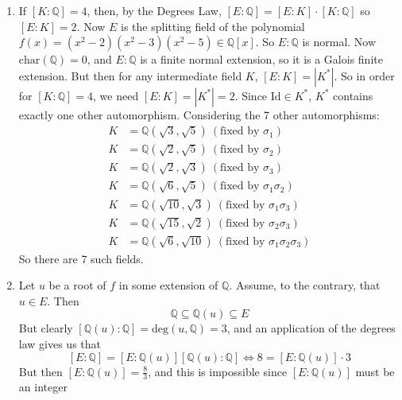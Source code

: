 \documentclass[11pt]{article}
\begin{document}
\begin{enumerate}[label={(\alph*)}, left=16pt]
\[    \mathbb{Q}(\sqrt{2} + \sqrt{5}) \subseteq \mathbb{Q}(\sqrt{2}, \sqrt{5})
    \] 
    On the other hand, $(\sqrt{2} + \sqrt{5})^{-1} = \frac{\sqrt{5} - \sqrt{2}}{3} \in \mathbb{Q}(\sqrt{2} + \sqrt{5})$. So $\sqrt{2},\sqrt{5} \in \mathbb{Q}(\sqrt{2} + \sqrt{5})$ and thus $\mathbb{Q}(\sqrt{2} + \sqrt{5}) = \mathbb{Q}(\sqrt{2}, \sqrt{5})$. In the same way as we did in (a), a basis of $\mathbb{Q}(\sqrt{2}, \sqrt{5})$ over $\mathbb{Q}$ is $\{1, \sqrt{2}, \sqrt{5}, \sqrt{10}\}$. Thus fixing both $\sqrt{2}$ and $\sqrt{5}$ is enough to fix $K_1$ and so:
    \[
    K_2^* = \{\text{Id}, \sigma_2\}
    \]
    \item If $[K:\mathbb{Q}] = 4$, then, by the Degrees Law, $[E:\mathbb{Q}] = [E:K] \cdot [K:\mathbb{Q}]$ so $[E:K] = 2$. Now $E$ is the splitting field of the polynomial $f(x) = (x^2 - 2)(x^2 - 3) (x^2 - 5) \in \mathbb{Q}[x]$. So $E:\mathbb{Q}$ is normal. Now $\text{char}(\mathbb{Q}) = 0$, and $E:\mathbb{Q}$ is a finite normal extension, so it is a Galois finite extension. But then for any intermediate field $K$, $[E:K] = |K^*|$. So in order for $[K:\mathbb{Q}] = 4$, we need $[E:K] = |K^*| = 2$. Since $\text{Id} \in K^*$, $K^*$ contains exactly one other automorphism. Considering the 7 other automorphisms:
    \begin{align*}
      K & = \mathbb{Q}(\sqrt{3}, \sqrt{5}) \  (\text{fixed by }\sigma_1)\\
      K & = \mathbb{Q}(\sqrt{2}, \sqrt{5}) \  (\text{fixed by }\sigma_2)\\
      K & = \mathbb{Q}(\sqrt{2}, \sqrt{3})\  (\text{fixed by }\sigma_3)\\
      K & = \mathbb{Q}(\sqrt{6}, \sqrt{5}) \  (\text{fixed by }\sigma_1\sigma_2)\\
      K & = \mathbb{Q}(\sqrt{10}, \sqrt{3}) \  (\text{fixed by }\sigma_1\sigma_3)\\
      K & = \mathbb{Q}(\sqrt{15}, \sqrt{2})\  (\text{fixed by }\sigma_2\sigma_3)\\
      K & = \mathbb{Q}(\sqrt{6}, \sqrt{10})\  (\text{fixed by }\sigma_1\sigma_2\sigma_3)
    \end{align*}
    So there are 7 such fields.
    \item Let $u$ be a root of $f$ in some extension of $\mathbb{Q}$. Assume, to the contrary, that $u \in E$. Then \[
    \mathbb{Q} \subseteq \mathbb{Q}(u) \subseteq E
    \]
    But clearly $[\mathbb{Q}(u):\mathbb{Q}] = \text{deg}(u, \mathbb{Q}) = 3$, and an application of the degrees law gives us that \[
    [E: \mathbb{Q}] = [E:\mathbb{Q}(u)][\mathbb{Q}(u):\mathbb{Q}] \iff 8 = [E:\mathbb{Q}(u)] \cdot 3
    \]
    But then $[E:\mathbb{Q}(u)] = \frac{8}{3}$, and this is impossible since $[E:\mathbb{Q}(u)]$ must be an integer
\end{enumerate}
\end{document}
